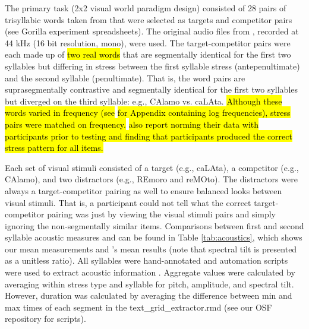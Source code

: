 The primary task (2x2 visual world paradigm design) consisted of 28 pairs of trisyllabic words taken from \cite{Sulpizio_McQueen_2012} that were selected as targets and competitor pairs (see Gorilla experiment spreadsheets). The original audio files from \cite{Sulpizio_McQueen_2012}, recorded at 44 kHz (16 bit resolution, mono), were used. The target-competitor pairs were each made up of \hl{two real words} that are segmentally identical for the first two syllables but differing in stress between the first syllable stress (antepenultimate) and the second syllable (penultimate). That is, the word pairs are suprasegmentally contrastive and segmentally identical for the first two syllables but diverged on the third syllable: e.g., CAlamo vs. caLAta. \hl{Although these words varied in frequency (see} \cite{Sulpizio_McQueen_2012} \hl{for Appendix containing log frequencies), stress pairs were matched on frequency.} \cite{Sulpizio_McQueen_2012} \hl{also report norming their data with participants prior to testing and finding that participants produced the correct stress pattern for all items.}

Each set of visual stimuli consisted of a target (e.g., caLAta), a competitor (e.g., CAlamo), and two distractors (e.g., REmoro and reMOto). The distractors were always a target-competitor pairing as well to ensure balanced looks between visual stimuli. That is, a participant could not tell what the correct target-competitor pairing was just by viewing the visual stimuli pairs and simply ignoring the non-segmentally similar items. Comparisons between first and second syllable acoustic measures and can be found in Table \ref{tab:acoustics}, which shows our mean measurements and \cite{Sulpizio_McQueen_2012}'s mean results (note that spectral tilt is presented as a unitless ratio). All syllables were hand-annotated and automation scripts were used to extract acoustic information \citep{qi_textgrid_maker, dicanio_vowel_acoustics}. Aggregate values were calculated by averaging within stress type and syllable for pitch, amplitude, and spectral tilt. However, duration was calculated by averaging the difference between min and max times of each segment in the text\_grid\_extractor.rmd (see our OSF repository for scripts). 

